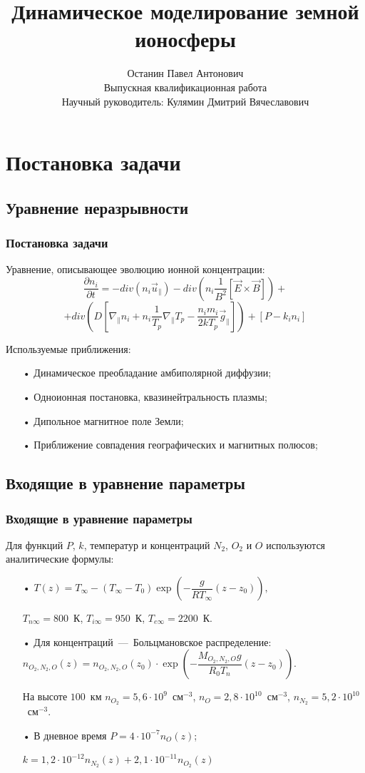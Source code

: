 \documentclass[9pt, apectratio=43,unicode]{beamer}
\title[Моделирование земной ионосферы]{Динамическое моделирование земной ионосферы}
\author[Останин П. А.]{Останин Павел Антонович \\ \vspace{1ex} Выпускная квалификационная работа\\ \vspace{1ex} Научный руководитель: Кулямин Дмитрий Вячеславович}
\date{}
\begin{document}
\begin{frame}[plain]
\titlepage
\end{frame}

\def\L{\mathcal{L}}

\section{Постановка задачи}
\subsection{Уравнение неразрывности}
\begin{frame}\frametitle{Постановка задачи}

Уравнение, описывающее эволюцию ионной концентрации: $$\dfrac{\partial n_i}{\partial t} = -div(n_i \vec{u}_\parallel)-div\left(n_i\dfrac{1}{B^2}[\vec{E}\times \vec{B}] \right)+$$ $$+div\left(D\left[\nabla_\parallel n_i +n_i\dfrac{1}{T_p}\nabla_\parallel T_p - \dfrac{n_i m_i}{2kT_p}\vec{g}_\parallel\right]\right)+[P-k_in_i]$$

Используемые приближения:
\begin{itemize}
\item[•] Динамическое преобладание амбиполярной диффузии;
\item[•] Одноионная постановка, квазинейтральность плазмы;
\item[•] Дипольное магнитное поле Земли;
\item[•] Приближение совпадения географических и магнитных полюсов;
\end{itemize}
\end{frame}


\subsection{Входящие в уравнение параметры}
\begin{frame}\frametitle{Входящие в уравнение параметры}
Для функций $P$, $k$, температур и концентраций $N_2$, $O_2$ и $O$ используются аналитические формулы: 
\begin{itemize}
\item[•] $T(z)=T_\infty - (T_\infty-T_0)\exp\left(-\dfrac{g}{RT_\infty}(z-z_0)\right),$ 

$T_{n\infty}=800$~К, $T_{i\infty}=950$~К, $T_{e\infty}=2200$~К.

\smallskip

\item[•] Для концентраций~---~Больцмановское распределение: $n_{O_2, N_2, O} (z)= n_{O_2, N_2, O} (z_0)\cdot \exp\left(-\dfrac{M_{O_2, N_2, O}g}{R_0T_n}(z-z_0)\right).$ 

На высоте $100$~км $n_{O_2} = 5{,}6\cdot 10^9$~см$^{-3}$, $n_{O} = 2{,}8\cdot 10^{10}$~см$^{-3}$, $n_{N_2} = 5{,}2\cdot 10^{10}$~см$^{-3}$.

\smallskip


\item[•] В дневное время $P=4\cdot10^{-7}n_O(z)$;

$k=1{,}2\cdot10^{-12}n_{N_2}(z)+2{,}1\cdot10^{-11}n_{O_2}(z)$
\end{itemize}
\end{frame}
\end{document}
